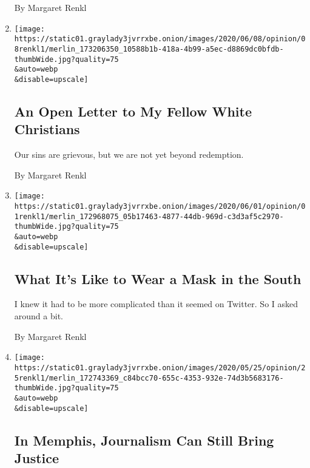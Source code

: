 \begin{enumerate}
  By Margaret Renkl
\item
  \href{/2020/06/08/opinion/protests-white-christian-racism.html}{}

  \texttt{[image: https://static01.graylady3jvrrxbe.onion/images/2020/06/08/opinion/08renkl1/merlin\_173206350\_10588b1b-418a-4b99-a5ec-d8869dc0bfdb-thumbWide.jpg?quality=75\\\&auto=webp\\\&disable=upscale]}

  \hypertarget{an-open-letter-to-my-fellow-white-christians}{%
  \subsection{An Open Letter to My Fellow White
  Christians}\label{an-open-letter-to-my-fellow-white-christians}}

  Our sins are grievous, but we are not yet beyond redemption.

  By Margaret Renkl
\item
  \href{/2020/06/01/opinion/coronavirus-face-mask-south.html}{}

  \texttt{[image: https://static01.graylady3jvrrxbe.onion/images/2020/06/01/opinion/01renkl1/merlin\_172968075\_05b17463-4877-44db-969d-c3d3af5c2970-thumbWide.jpg?quality=75\\\&auto=webp\\\&disable=upscale]}

  \hypertarget{what-its-like-to-wear-a-mask-in-the-south}{%
  \subsection{What It's Like to Wear a Mask in the
  South}\label{what-its-like-to-wear-a-mask-in-the-south}}

  I knew it had to be more complicated than it seemed on Twitter. So I
  asked around a bit.

  By Margaret Renkl
\item
  \href{/2020/05/25/opinion/memphis-journalism.html}{}

  \texttt{[image: https://static01.graylady3jvrrxbe.onion/images/2020/05/25/opinion/25renkl1/merlin\_172743369\_c84bcc70-655c-4353-932e-74d3b5683176-thumbWide.jpg?quality=75\\\&auto=webp\\\&disable=upscale]}

  \hypertarget{in-memphis-journalism-can-still-bring-justice}{%
  \subsection{In Memphis, Journalism Can Still Bring
  Justice}\label{in-memphis-journalism-can-still-bring-justice}}


\end{enumerate}
